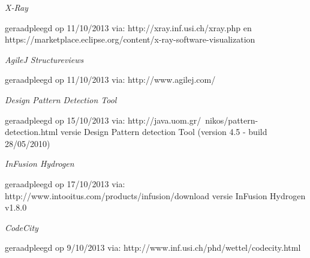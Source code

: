 \documentclass[i1]{oss}
\begin{document}
\newpage
\begin{flushleft}
\begin{thebibliography}{4}

\emph{X-Ray}
\begin{scriptsize}
geraadpleegd op 11/10/2013 via: \mbox{http://xray.inf.usi.ch/xray.php} en \mbox{https://marketplace.eclipse.org/content/x-ray-software-visualization}
\end{scriptsize}

\emph{AgileJ Structureviews}
\begin{scriptsize}
geraadpleegd op 11/10/2013 via: \mbox{http://www.agilej.com/}
\end{scriptsize}

\emph{Design Pattern Detection Tool}
\begin{scriptsize}
geraadpleegd op 15/10/2013 via: \mbox{http://java.uom.gr/~nikos/pattern-detection.html} versie  Design Pattern detection Tool (version 4.5 - build 28/05/2010)
\end{scriptsize}

\emph{InFusion Hydrogen}
\begin{scriptsize}
geraadpleegd op 17/10/2013 via: \mbox{http://www.intooitus.com/products/infusion/download} versie InFusion Hydrogen v1.8.0
\end{scriptsize}

\emph{CodeCity}
\begin{scriptsize}
geraadpleegd op 9/10/2013 via: \mbox{http://www.inf.usi.ch/phd/wettel/codecity.html} 
\end{scriptsize}

\end{thebibliography}
\end{flushleft}
\end{document}

